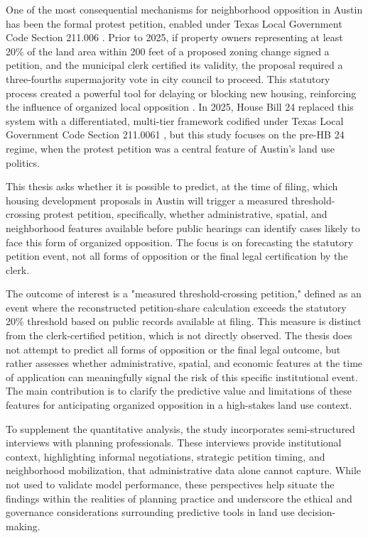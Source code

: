\documentclass[11pt, letterpaper, oneside]{article}
\begin{document}
One of the most consequential mechanisms for neighborhood opposition in Austin has been the formal protest petition, enabled under Texas Local Government Code Section 211.006 \cite{texas211006}. Prior to 2025, if property owners representing at least 20\% of the land area within 200 feet of a proposed zoning change signed a petition, and the municipal clerk certified its validity, the proposal required a three-fourths supermajority vote in city council to proceed. This statutory process created a powerful tool for delaying or blocking new housing, reinforcing the influence of organized local opposition \cite{furth2023invisible}. In 2025, House Bill 24 replaced this system with a differentiated, multi-tier framework codified under Texas Local Government Code Section 211.0061 \cite{texas2110061,hamilton2024texas,hb24_2025}, but this study focuses on the pre-HB 24 regime, when the protest petition was a central feature of Austin's land use politics.

This thesis asks whether it is possible to predict, at the time of filing, which housing development proposals in Austin will trigger a measured threshold-crossing protest petition, specifically, whether administrative, spatial, and neighborhood features available before public hearings can identify cases likely to face this form of organized opposition. The focus is on forecasting the statutory petition event, not all forms of opposition or the final legal certification by the clerk.

The outcome of interest is a "measured threshold-crossing petition," defined as an event where the reconstructed petition-share calculation exceeds the statutory 20\% threshold based on public records available at filing. This measure is distinct from the clerk-certified petition, which is not directly observed. The thesis does not attempt to predict all forms of opposition or the final legal outcome, but rather assesses whether administrative, spatial, and economic features at the time of application can meaningfully signal the risk of this specific institutional event. The main contribution is to clarify the predictive value and limitations of these features for anticipating organized opposition in a high-stakes land use context.

To supplement the quantitative analysis, the study incorporates semi-structured interviews with planning professionals. These interviews provide institutional context, highlighting informal negotiations, strategic petition timing, and neighborhood mobilization, that administrative data alone cannot capture. While not used to validate model performance, these perspectives help situate the findings within the realities of planning practice and underscore the ethical and governance considerations surrounding predictive tools in land use decision-making.
\end{document}
